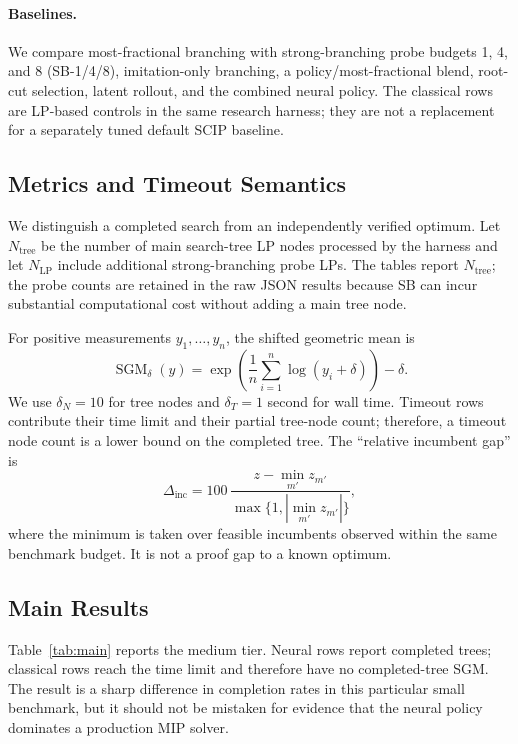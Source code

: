 \documentclass{article}
\newcommand{\SGM}{\operatorname{SGM}}
\begin{document}
\paragraph{Baselines.}
We compare most-fractional branching with strong-branching probe budgets 1, 4, and 8 (SB-1/4/8), imitation-only branching, a policy/most-fractional blend, root-cut selection, latent rollout, and the combined neural policy. The classical rows are LP-based controls in the same research harness; they are not a replacement for a separately tuned default SCIP baseline.


\subsection{Metrics and Timeout Semantics}

We distinguish a completed search from an independently verified optimum. Let $N_{\mathrm{tree}}$ be the number of main search-tree LP nodes processed by the harness and let $N_{\mathrm{LP}}$ include additional strong-branching probe LPs. The tables report $N_{\mathrm{tree}}$; the probe counts are retained in the raw JSON results because SB can incur substantial computational cost without adding a main tree node.

For positive measurements $y_1,\ldots,y_n$, the shifted geometric mean is
\begin{equation}
  \SGM_\delta(y)=
  \exp\!\left(\frac1n\sum_{i=1}^{n}\log(y_i+\delta)\right)-\delta .
  \label{eq:sgm}
\end{equation}
We use $\delta_N=10$ for tree nodes and $\delta_T=1$ second for wall time. Timeout rows contribute their time limit and their partial tree-node count; therefore, a timeout node count is a lower bound on the completed tree. The ``relative incumbent gap'' is
\begin{equation}
  \Delta_{\mathrm{inc}}=
  100\,
  \frac{z-\min_{m'}z_{m'}}{\max\{1,|\min_{m'}z_{m'}|\}},
  \label{eq:inc-gap}
\end{equation}
where the minimum is taken over feasible incumbents observed within the same benchmark budget. It is not a proof gap to a known optimum.


\subsection{Main Results}

Table~\ref{tab:main} reports the medium tier. Neural rows report completed trees; classical rows reach the time limit and therefore have no completed-tree SGM. The result is a sharp difference in completion rates in this particular small benchmark, but it should not be mistaken for evidence that the neural policy dominates a production MIP solver.
\end{document}
